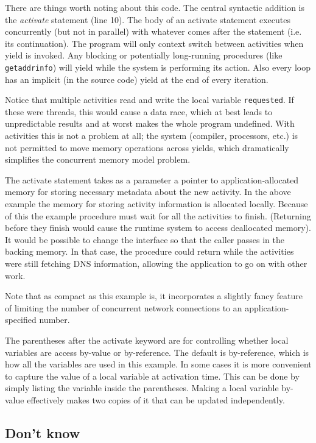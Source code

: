 \documentclass[10pt,preprint]{sigplanconf}
\begin{document}
There are things worth noting about this code.
The central syntactic addition is the \emph{activate} statement (line 10).
The body of an activate statement executes concurrently (but not in parallel) with whatever comes after the statement (i.e. its continuation).
The program will only context switch between activities when yield is invoked.
Any blocking or potentially long-running procedures (like \texttt{getaddrinfo}) will yield while the system is performing its action.
Also every loop has an implicit (in the source code) yield at the end of every iteration.

Notice that multiple activities read and write the local variable \texttt{requested}.
If these were threads, this would cause a data race, which at best leads to unpredictable results and at worst makes the whole program undefined.
With activities this is not a problem at all; the system (compiler, processors, etc.) is not permitted to move memory operations across yields, which dramatically simplifies the concurrent memory model problem.

The activate statement takes as a parameter a pointer to application-allocated memory for storing necessary metadata about the new activity.
In the above example the memory for storing activity information is allocated locally.
Because of this the example procedure must wait for all the activities to finish.
(Returning before they finish would cause the runtime system to access deallocated memory).
It would be possible to change the interface so that the caller passes in the backing memory.
In that case, the procedure could return while the activities were still fetching DNS information, allowing the application to go on with other work.

Note that as compact as this example is, it incorporates a slightly fancy feature of limiting the number of concurrent network connections to an application-specified number.

The parentheses after the activate keyword are for controlling whether local variables are access by-value or by-reference.
The default is by-reference, which is how all the variables are used in this example.
In some cases it is more convenient to capture the value of a local variable at activation time.
This can be done by simply listing the variable inside the parentheses.
Making a local variable by-value effectively makes two copies of it that can be updated independently.

\subsection{Don't know}
\end{document}
